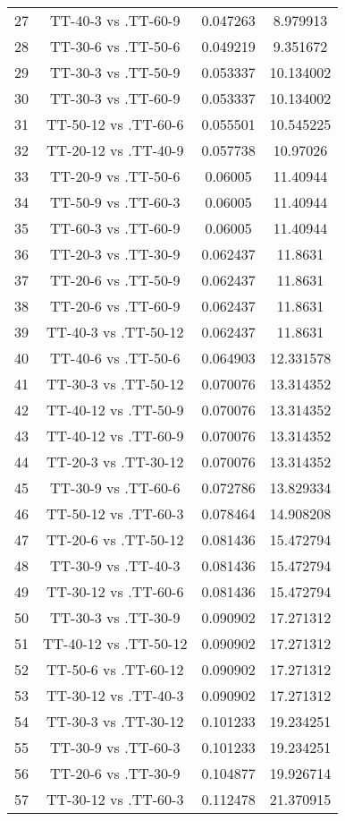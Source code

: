 \documentclass[a4paper,10pt]{article}
\begin{document}
\begin{landscape}
\begin{table}[!htp]
\begin{tabular}{cccc}
27&TT-40-3 vs .TT-60-9&0.047263&8.979913\\
28&TT-30-6 vs .TT-50-6&0.049219&9.351672\\
29&TT-30-3 vs .TT-50-9&0.053337&10.134002\\
30&TT-30-3 vs .TT-60-9&0.053337&10.134002\\
31&TT-50-12 vs .TT-60-6&0.055501&10.545225\\
32&TT-20-12 vs .TT-40-9&0.057738&10.97026\\
33&TT-20-9 vs .TT-50-6&0.06005&11.40944\\
34&TT-50-9 vs .TT-60-3&0.06005&11.40944\\
35&TT-60-3 vs .TT-60-9&0.06005&11.40944\\
36&TT-20-3 vs .TT-30-9&0.062437&11.8631\\
37&TT-20-6 vs .TT-50-9&0.062437&11.8631\\
38&TT-20-6 vs .TT-60-9&0.062437&11.8631\\
39&TT-40-3 vs .TT-50-12&0.062437&11.8631\\
40&TT-40-6 vs .TT-50-6&0.064903&12.331578\\
41&TT-30-3 vs .TT-50-12&0.070076&13.314352\\
42&TT-40-12 vs .TT-50-9&0.070076&13.314352\\
43&TT-40-12 vs .TT-60-9&0.070076&13.314352\\
44&TT-20-3 vs .TT-30-12&0.070076&13.314352\\
45&TT-30-9 vs .TT-60-6&0.072786&13.829334\\
46&TT-50-12 vs .TT-60-3&0.078464&14.908208\\
47&TT-20-6 vs .TT-50-12&0.081436&15.472794\\
48&TT-30-9 vs .TT-40-3&0.081436&15.472794\\
49&TT-30-12 vs .TT-60-6&0.081436&15.472794\\
50&TT-30-3 vs .TT-30-9&0.090902&17.271312\\
51&TT-40-12 vs .TT-50-12&0.090902&17.271312\\
52&TT-50-6 vs .TT-60-12&0.090902&17.271312\\
53&TT-30-12 vs .TT-40-3&0.090902&17.271312\\
54&TT-30-3 vs .TT-30-12&0.101233&19.234251\\
55&TT-30-9 vs .TT-60-3&0.101233&19.234251\\
56&TT-20-6 vs .TT-30-9&0.104877&19.926714\\
57&TT-30-12 vs .TT-60-3&0.112478&21.370915\\

\end{tabular}
\end{table}
\end{landscape}
\end{document}
